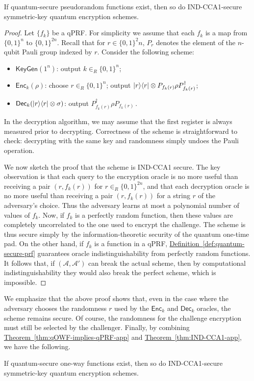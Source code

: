 \documentclass[envcountsame]{llncs}
\numberwithin{equation}{section}
\newcommand{\expref}[2]{\texorpdfstring{\hyperref[#2]{#1~\ref{#2}}}{#1~\ref{#2}}}
\newcommand{\algo}{\mathcal}
\newcommand{\KeyGen}{\ensuremath{\mathsf{KeyGen}}\xspace}
\newcommand{\Enc}{\ensuremath{\mathsf{Enc}}\xspace}
\newcommand{\Dec}{\ensuremath{\mathsf{Dec}}\xspace}
\newcommand{\inrand}{\in_R}
\begin{document}
\begin{theorem}\label{thm:IND-CCA1-app}
If quantum-secure pseudorandom functions exist, then so do IND-CCA1-secure symmetric-key quantum encryption schemes.
\end{theorem}
\begin{proof}
Let $\{f_k\}$ be a qPRF. For simplicity we assume that each $f_k$ is a map from $\{0, 1\}^n$ to $\{0, 1\}^{2n}$. Recall that for $r \in \{0, 1\}^2n$, $P_r$ denotes the element of the $n$-qubit Pauli group indexed by $r$. Consider the following scheme:
\begin{itemize}
\item $\KeyGen(1^n)$: output $k \inrand \{0, 1\}^n$;
\item $\Enc_k(\rho)$: choose $r \inrand \{0, 1\}^n$; output ${\left\vert{r}\right\rangle}{\left\langle{r}\right\vert} \otimes P_{f_k(r)} \rho P_{f_k(r)}^{\dagger}$;
\item $\Dec_k(\ket{r}\bra{r} \otimes \sigma)$: output  $P_{f_k(r)}^\dagger \rho P_{f_k(r)}$\,.
\end{itemize}
In the decryption algorithm, we may assume that the first register is always measured prior to decrypting. Correctness of the scheme is straightforward to check: decrypting with the same key and randomness simply undoes the Pauli operation.

We now sketch the proof that the scheme is IND-CCA1 secure. The key observation is that each query to the encryption oracle is no more useful than receiving a pair $(r, f_k(r))$ for $r \inrand \{0, 1\}^{2n}$, and that each decryption oracle is no more useful than receiving a pair $(r, f_k(r))$ for a string $r$ of the adversary's choice. Thus the adversary learns at most a polynomial number of values of $f_k$. Now, if $f_k$ is a perfectly random function, then these values are completely uncorrelated to the one used to encrypt the challenge. The scheme is thus secure simply by the information-theoretic security of the quantum one-time pad. On the other hand, if $f_k$ is a function in a qPRF, \expref{Definition}{def:quantum-secure-prf} guarantees oracle indistinguishability from perfectly random functions. It follows that, if $(\algo A, \algo A')$ can break the actual scheme, then by computational indistinguishability they would also break the perfect scheme, which is impossible.
\end{proof}

We emphasize that the above proof shows that, even in the case where the adversary chooses the randomness $r$ used by the $\Enc_k$ and $\Dec_k$ oracles, the scheme remains secure. Of course, the randomness for the challenge encryption must still be selected by the challenger. Finally, by combining \expref{Theorem}{thm:qOWF-implies-qPRF-app} and \expref{Theorem}{thm:IND-CCA1-app}, we have the following.

\begin{theorem}\label{thm:qOWF-implies-qSKE-app}
If quantum-secure one-way functions exist, then so do IND-CCA1-secure symmetric-key quantum encryption schemes.
\end{theorem}
\end{document}
